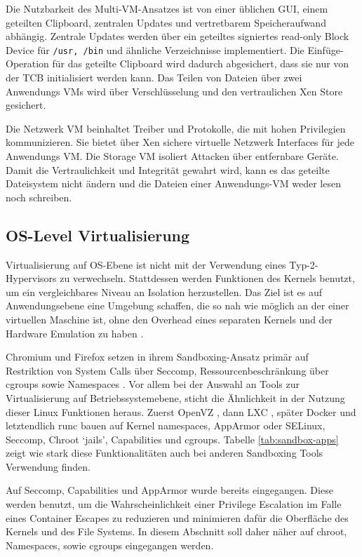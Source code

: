 Die Nutzbarkeit des Multi-VM-Ansatzes ist von einer üblichen GUI, einem geteilten Clipboard, zentralen Updates und vertretbarem Speicheraufwand abhängig. Zentrale Updates werden über ein geteiltes signiertes read-only Block Device für \texttt{/usr, /bin} und ähnliche Verzeichnisse implementiert. Die Einfüge-Operation für das geteilte Clipboard wird dadurch abgesichert, dass sie nur von der TCB initialisiert werden kann. Das Teilen von Dateien über zwei Anwendungs VMs wird über
Verschlüsselung und den vertraulichen Xen Store gesichert. 

Die Netzwerk VM beinhaltet Treiber und Protokolle, die mit hohen Privilegien kommunizieren. Sie bietet über Xen sichere virtuelle Netzwerk Interfaces für jede Anwendungs VM. Die Storage VM isoliert Attacken über entfernbare Geräte. Damit die Vertraulichkeit und Integrität gewahrt wird, kann es das geteilte Dateisystem nicht ändern und die Dateien einer Anwendungs-VM weder lesen noch schreiben.


\subsection{OS-Level Virtualisierung}

Virtualisierung auf OS-Ebene ist nicht mit der Verwendung eines Typ-2-Hypervisors zu verwechseln. Stattdessen werden Funktionen des Kernels benutzt, um ein vergleichbares Niveau an Isolation herzustellen.
Das Ziel ist es auf Anwendungsebene eine Umgebung schaffen, die so nah wie möglich an der einer virtuellen Maschine ist, ohne den Overhead eines separaten Kernels und der Hardware Emulation zu haben \cite{lxc}.

Chromium und Firefox setzen in ihrem Sandboxing-Ansatz primär auf Restriktion von System Calls über Seccomp, Ressourcenbeschränkung über cgroups sowie Namespaces \cite{firefox-sandbox, chromium-sandbox}. 
Vor allem bei der Auswahl an Tools zur Virtualisierung auf Betriebssystemebene, sticht die Ähnlichkeit in der Nutzung dieser Linux Funktionen heraus. Zuerst OpenVZ \cite{openvz}, dann LXC
\cite{lxc}, später Docker \cite{docker} und letztendlich runc \cite{runc} bauen auf Kernel namespaces, AppArmor oder SELinux, Seccomp, Chroot `jails', Capabilities und cgroups. 
Tabelle \ref{tab:sandbox-apps} zeigt wie stark diese Funktionalitäten auch bei anderen Sandboxing Tools Verwendung finden.

Auf Seccomp, Capabilities und AppArmor wurde bereits eingegangen. Diese werden
benutzt, um die Wahrscheinlichkeit einer Privilege Escalation im Falle eines Container Escapes zu reduzieren und minimieren dafür die Oberfläche des Kernels und des File Systems. In diesem Abschnitt soll daher näher auf chroot, Namespaces, sowie cgroups eingegangen werden.

